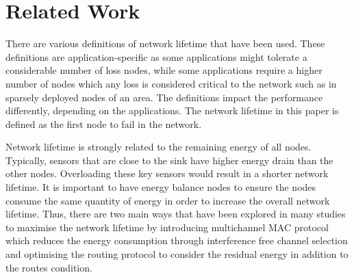 \section{Related Work}
\label{RelatedWork}

There are various definitions of network lifetime that have been used. These definitions are application-specific as some applications might tolerate a considerable number of loss nodes, while some applications require a higher number of nodes which any loss is considered critical to the network such as in sparsely deployed nodes of an area. The definitions impact the performance differently, depending on the applications. The network lifetime in this paper is defined as the first node to fail in the network.


Network lifetime is strongly related to the remaining energy of all nodes. Typically, sensors that are close to the sink have higher energy drain than the other nodes. Overloading these key sensors would result in a shorter network lifetime.
It is important to have energy balance nodes to ensure the nodes consume the same quantity of energy in order to increase the overall network lifetime.
Thus, there are two main ways that have been explored in many studies to maximise the network lifetime by introducing multichannel MAC protocol which reduces the energy consumption through interference free channel selection and optimising the routing protocol to consider the residual energy in addition to the routes condition.



